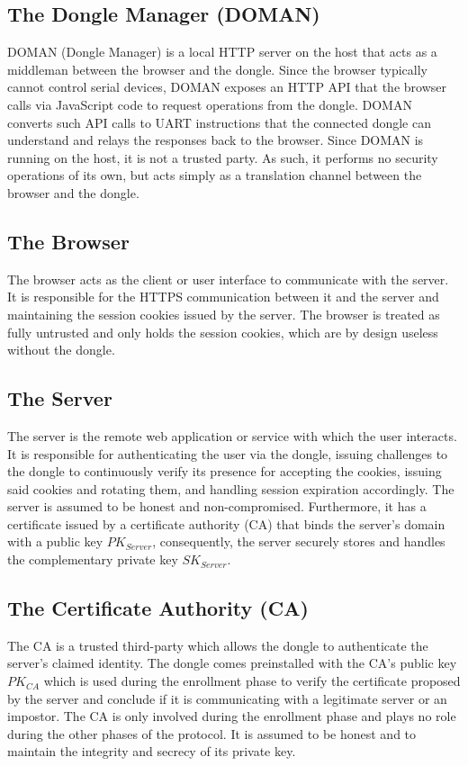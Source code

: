 \subsection{The Dongle Manager (DOMAN)}
DOMAN (Dongle Manager) is a local HTTP server on the host that acts as a middleman between the browser and the dongle. Since the browser typically cannot control serial devices, DOMAN exposes an HTTP API that the browser calls via JavaScript code to request operations from the dongle. DOMAN converts such API calls to UART instructions that the connected dongle can understand and relays the responses back to the browser. Since DOMAN is running on the host, it is not a trusted party. As such, it performs no security operations of its own, but acts simply as a translation channel between the browser and the dongle.

\subsection{The Browser}
The browser acts as the client or user interface to communicate with the server. It is responsible for the HTTPS communication between it and the server and maintaining the session cookies issued by the server. The browser is treated as fully untrusted and only holds the session cookies, which are by design useless without the dongle.

\subsection{The Server}
The server is the remote web application or service with which the user interacts. It is responsible for authenticating the user via the dongle, issuing challenges to the dongle to continuously verify its presence for accepting the cookies, issuing said cookies and rotating them, and handling session expiration accordingly. The server is assumed to be honest and non-compromised. Furthermore, it has a certificate issued by a certificate authority (CA) that binds the server's domain with a public key $PK_{Server}$, consequently, the server securely stores and handles the complementary private key $SK_{Server}$.

\subsection{The Certificate Authority (CA)}
The CA is a trusted third-party which allows the dongle to authenticate the server's claimed identity. The dongle comes preinstalled with the CA's public key $PK_{CA}$ which is used during the enrollment phase to verify the certificate proposed by the server and conclude if it is communicating with a legitimate server or an impostor. The CA is only involved during the enrollment phase and plays no role during the other phases of the protocol. It is assumed to be honest and to maintain the integrity and secrecy of its private key.

